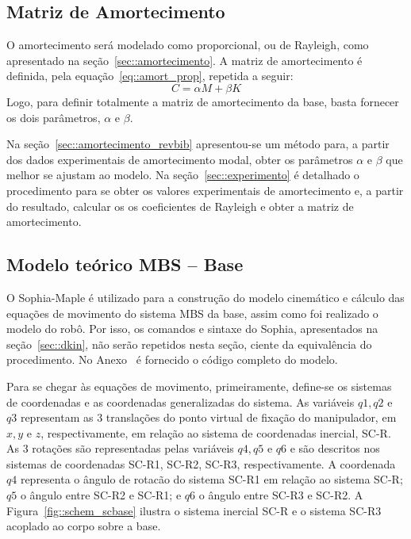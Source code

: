 \subsection{Matriz de Amortecimento}

O amortecimento será modelado como proporcional, ou de Rayleigh, como
apresentado na seção~\ref{sec::amortecimento}. A matriz de amortecimento é
definida, pela equação~\ref{eq::amort_prop}, repetida a seguir:
%
\begin{equation*}
	C = \alpha M + \beta K
\end{equation*}
%
Logo, para definir totalmente a matriz de amortecimento da base, basta fornecer
os dois parâmetros, $\alpha$ e $\beta$.

Na seção~\ref{sec::amortecimento_revbib} apresentou-se um método para, a partir dos dados
experimentais de amortecimento modal, obter os parâmetros $\alpha$ e $\beta$ que
melhor se ajustam ao modelo. Na seção~\ref{sec::experimento} é
detalhado o procedimento para se obter os valores experimentais de amortecimento
e, a partir do resultado, calcular os os coeficientes de Rayleigh e obter a
matriz de amortecimento.



\subsection{Modelo teórico MBS -- Base}

O Sophia-Maple é utilizado para a construção do modelo cinemático e
cálculo das equações de movimento do sistema MBS da base, assim como foi
realizado o modelo do robô. Por isso, os comandos e sintaxe do Sophia,
apresentados na seção~\ref{sec::dkin}, não serão repetidos nesta seção, ciente
da equivalência do procedimento. No Anexo~ é
fornecido o código completo do modelo.

Para se chegar às equações de movimento, primeiramente, define-se os sistemas de
coordenadas e as coordenadas generalizadas do sistema.
As variáveis $q1, q2$ e $q3$ representam as 3 translações do ponto virtual de
fixação do manipulador, em $x,y$ e $z$, respectivamente, em relação ao sistema de
coordenadas inercial, SC-R. As 3 rotações são representadas pelas variáveis
$q4, q5$ e $q6$ e são descritos nos sistemas de coordenadas SC-R1, SC-R2,
SC-R3, respectivamente.
A coordenada $q4$ representa o ângulo de rotacão do sistema SC-R1
em relação ao sistema SC-R; $q5$ o ângulo entre SC-R2 e SC-R1; e $q6$ o ângulo
entre SC-R3 e SC-R2. A Figura~\ref{fig::schem_scbase} ilustra o sistema inercial
SC-R e o sistema SC-R3 acoplado ao corpo sobre a base.

